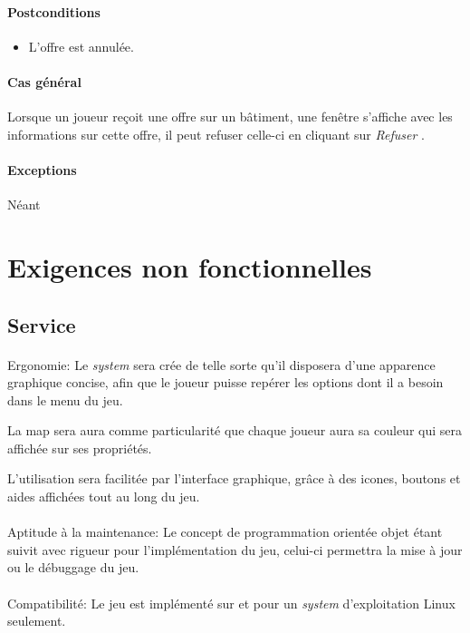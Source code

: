 \documentclass[a4paper,11pt]{report}
\begin{document}
\paragraph{Postconditions}
\begin{itemize}
 \item L'offre est annulée.
\end{itemize}
\paragraph{Cas général}
Lorsque un joueur reçoit une offre sur un bâtiment, une fenêtre s'affiche avec les informations sur cette offre, il peut refuser celle-ci en cliquant sur \og \textit{Refuser} \fg.
\paragraph{Exceptions} Néant

\newpage
\section{Exigences non fonctionnelles}
\subsection{Service}
\paragraph{}Ergonomie:  \newline
Le \textit{system} sera crée de telle sorte qu'il disposera d’une apparence graphique concise, afin que le joueur puisse repérer les options dont il a besoin dans le menu du jeu.

La map sera aura comme particularité que chaque joueur aura sa couleur qui sera affichée sur ses propriétés.

L'utilisation sera facilitée par l'interface graphique, grâce à des icones, boutons et aides affichées tout au long du jeu.

\paragraph{}Aptitude à la maintenance:  \newline
Le concept de programmation orientée objet étant suivit avec rigueur pour l’implémentation du jeu, celui-ci permettra la mise à jour ou le débuggage du jeu.

\paragraph{}Compatibilité:  \newline
Le jeu est implémenté sur et pour un \textit{system} d'exploitation Linux seulement.
\end{document}
